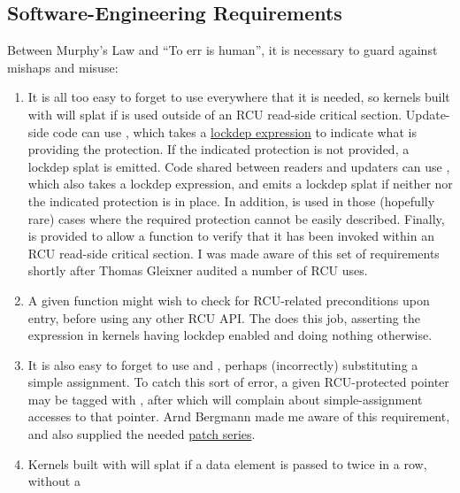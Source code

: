 \subsection{Software-Engineering Requirements}

Between Murphy's Law and ``To err is human'', it is necessary to guard
against mishaps and misuse:

\begin{enumerate}
\item It is all too easy to forget to use  everywhere
   that it is needed, so kernels built with  will
   splat if  is used outside of an RCU read-side
   critical section.
   Update-side code can use
   , which takes a
   \href{https://lwn.net/Articles/371986/}{lockdep expression} to indicate what is
   providing the protection.
   If the indicated protection is not
   provided, a lockdep splat is emitted.
   Code shared between readers and updaters can use
   , which also takes a lockdep expression,
   and emits a lockdep splat if neither  nor the
   indicated protection is in place.
   In addition,
    is used in those (hopefully rare) cases
   where the required protection cannot be easily described.
   Finally,
    is provided to allow a function to verify
   that it has been invoked within an RCU read-side critical section.
   I
   was made aware of this set of requirements shortly after Thomas
   Gleixner audited a number of RCU uses.
\item A given function might wish to check for RCU-related preconditions
   upon entry, before using any other RCU API\@.
   The
    does this job, asserting the expression in
   kernels having lockdep enabled and doing nothing otherwise.
\item It is also easy to forget to use  and
   , perhaps (incorrectly) substituting a simple
   assignment.
   To catch this sort of error, a given RCU-protected
   pointer may be tagged with , after which  will
   complain about simple-assignment accesses to that pointer.
   Arnd
   Bergmann made me aware of this requirement, and also supplied the
   needed \href{https://lwn.net/Articles/376011/}{patch series}.
\item Kernels built with  will splat if
   a data element is passed to  twice in a row, without a

\end{enumerate}
